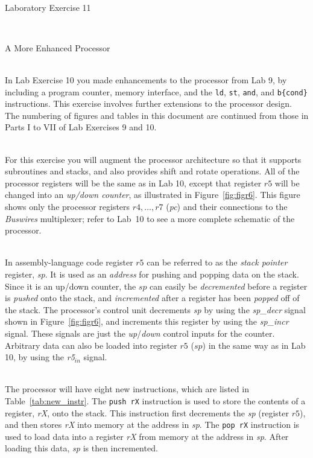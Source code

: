 \documentclass[epsfig,10pt,fullpage]{article} \addtolength{\textwidth}{1.5in}
\begin{document}
~\\
\centerline{\huge Laboratory Exercise 11}
~\\
\centerline{\large A More Enhanced Processor}
~\\
In Lab Exercise 10 you made enhancements to the processor from Lab 9, by including a
program counter, memory interface, and the \texttt{ld}, \texttt{st}, \texttt{and}, and
\texttt{b\{cond\}} instructions. This exercise involves
further extensions to the processor design. The numbering of 
figures and tables in this document are continued from those in Parts I to VII of Lab 
Exercises 9 and 10.

~\\
\noindent
For this exercise you will augment the processor architecture so that it supports
subroutines and stacks, and also provides shift and rotate operations. 
All of the processor registers will be the same as in Lab 10,
except that register $r5$ will be changed into an {\it up/down counter}, as illustrated 
in Figure~\ref{fig:figr6}. This figure shows only the processor 
registers $r4, \ldots, r7$ ({\it pc}) and their
connections to the {\it Buswires} multiplexer; refer to Lab~10 to see a more complete
schematic of the processor.

~\\
\noindent
In assembly-language code register $r5$ can be referred to as the {\it stack pointer} 
register, {\it sp}. It is used as an {\it address} for pushing and popping data on the stack. 
Since it is an up/down counter, the $sp$ can easily be
{\it decremented} before a register is {\it pushed} onto the stack, and {\it incremented} 
after a register has been {\it popped} off of the stack. The  processor's control unit 
decrements {\it sp} by using the {\it sp\_decr} signal shown in Figure~\ref{fig:figr6}, 
and increments this register by using the {\it sp\_incr} signal. These signals are just 
the {\it up}/{\it down} control inputs for the counter. Arbitrary data can also be 
loaded into register $r5$ ($sp$) in the same way as in Lab 10, by using the {\it r5}$_{in}$ signal.

~\\
\noindent
The processor will have eight new instructions, which are listed
in Table~\ref{tab:new_instr}. The \texttt{push rX} instruction is used to store the contents 
of a register, {\it rX}, onto the stack. This instruction first decrements the {\it sp} 
(register $r5$), and then stores {\it rX} into memory at the address in {\it sp}. The
\texttt{pop rX} instruction is used to load data into a register {\it rX} from memory at 
the address in {\it sp}.  After loading this data, {\it sp} is then incremented.     
\end{document}
